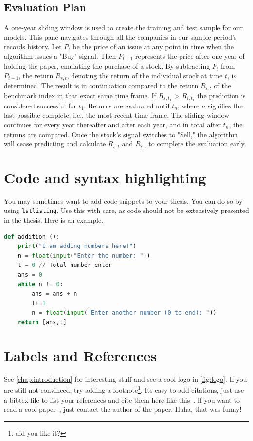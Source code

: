 \documentclass{imc-inf}
\begin{document}
\subsection{Evaluation Plan}%
A one-year sliding window is used to create the training and test sample for our models. This pane navigates through all the companies in our sample period's records history. Let $P_{t}$ be the price of an issue at any point in time when the algorithm issues a "Buy" signal. Then $P_{t+1}$ represents the price after one year of holding the paper, emulating the purchase of a stock. By subtracting $P_{t}$ from $P_{t+1}$, the return $R_{s,t}$, denoting the return of the individual stock at time $t$, is determined. The result is in continuation compared to the return $R_{i,t}$ of the benchmark index in that exact same time frame. If $R_{s,t_{1}}$ > $R_{i,t_{1}}$ the prediction is considered successful for $t_{1}$. Returns are evaluated until $t_{n}$, where $n$ signifies the last possible complete, i.e., the most recent time frame. The sliding window continues for every year thereafter and after each year, and in total after $t_{n}$, the returns are compared. Once the stock's signal switches to "Sell," the algorithm will cease predicting and calculate $R_{s,t}$ and $R_{i,t}$ to complete the evaluation early.


\section{Code and syntax highlighting}

You may sometimes want to add code snippets to your thesis. You can do so by using \texttt{lstlisting}. Use this with care, as code should not be extensively presented in the thesis. Here is an example. 

\begin{lstlisting}[language=Python]
def addition ():
    print("I am adding numbers here!")
    n = float(input("Enter the number: "))
    t = 0 // Total number enter
    ans = 0
    while n != 0:
        ans = ans + n
        t+=1
        n = float(input("Enter another number (0 to end): "))
    return [ans,t]
\end{lstlisting}

\section{Labels and References}
See \autoref{chap:introduction} for interesting stuff and see a cool logo in \autoref{fig:logo}. If you are still not convinced, try adding a footnote\footnote{did you like it?}. Its easy to add citations, just use a bibtex file to list your references and cite them here like this~\cite{988366}. If you want to read a cool paper~\cite{DBLP:conf/euromicro/DhunganaHW20}, just contact the author of the paper. Haha, that was funny! 
\end{document}
